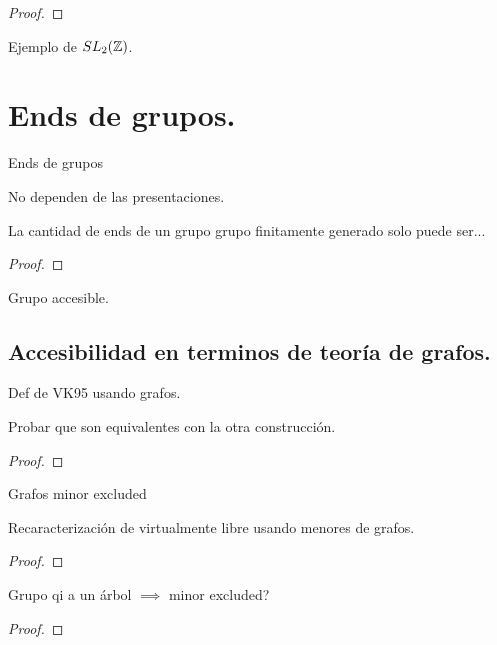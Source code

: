 \documentclass[tesis.tex]{subfiles}
\newcommand{\fg}{grupo finitamente generado }
\begin{document}
\begin{prop}
	
\end{prop}
\begin{proof}
\end{proof}

\begin{ej}
	Ejemplo de $SL_2(\mathbb{Z})$.
\end{ej}

\section{Ends de grupos.}

\begin{deff}
	Ends de grupos
\end{deff}

\begin{obs}
	No dependen de las presentaciones.
\end{obs}

\begin{teo}[Hopf]
	La cantidad de ends de un grupo \fg solo puede ser...
\end{teo}
\begin{proof}
\end{proof}

\begin{deff}
	Grupo accesible.
\end{deff}

\subsection{Accesibilidad en terminos de teoría de grafos.}

\begin{deff}
	Def de VK95 usando grafos.
\end{deff}

\begin{teo}
	Probar que son equivalentes con la otra construcción.
\end{teo}
\begin{proof}
	
\end{proof}


\begin{deff}
	Grafos minor excluded
\end{deff}

\begin{teo}[Khukro]
	Recaracterización de virtualmente libre usando menores de grafos.
\end{teo}
\begin{proof}
\end{proof}

\begin{teo}
	Grupo qi a un árbol $\implies$ minor excluded?
\end{teo}
\begin{proof}
\end{proof}
\end{document}
